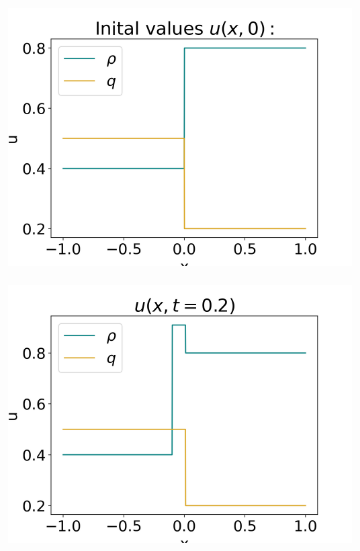 \documentclass[10pt]{article}
\numberwithin{equation}{section}
\begin{document}
\begin{figure}
         \centering
     \begin{subfigure}[t]{0.2\textwidth}
         \centering
         \includegraphics[width=\textwidth]{Figures/Model/Plots/SysContactsIV.png}
     \end{subfigure}
     \begin{subfigure}[t]{0.2\textwidth}
         \centering
         \includegraphics[width=\textwidth]{Figures/Model/Plots/SysContactsAtTime2.png}
     \end{subfigure}
     \begin{subfigure}[t]{0.2\textwidth}
         \centering

\end{subfigure}
\end{figure}
\end{document}
